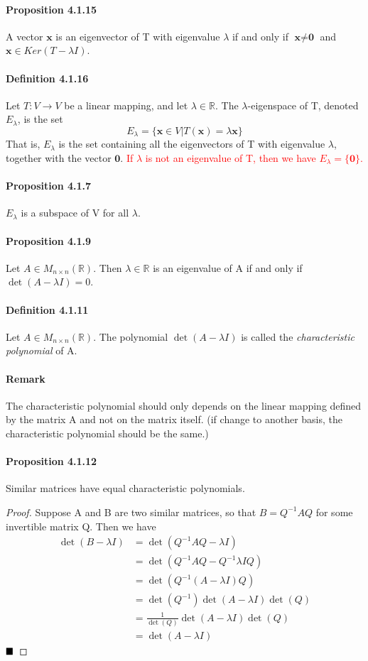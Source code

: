\documentclass[11pt]{article}
\newcommand{\ti}[1]{\textit{#1}}
\newcommand{\tb}[1]{\textbf{#1}}
\newcommand{\qed}[0]{$\hfill\blacksquare$}
\newcommand{\real}[0]{\mathbb{R}}
\newcommand{\vx}[0]{\tb{x}}
\newcommand{\vo}[0]{\tb{0}}
\begin{document}
{\paragraph{Proposition 4.1.15} A vector $\vx$ is an eigenvector of T with eigenvalue $\lambda$ if and only if $\vx \neq \vo$ and $\vx \in Ker(T - \lambda I)$.
\paragraph{Definition 4.1.16} Let $T: V \rightarrow V$ be a linear mapping, and let $\lambda \in \real$. The $\lambda$-eigenspace of T, denoted $E_\lambda$, is the set
$$E_\lambda = \{\vx\in V|T(\vx) = \lambda\vx\}$$
That is, $E_\lambda$ is the set containing all the eigenvectors of T with eigenvalue $\lambda$, together with the vector $\vo$. \textcolor{red}{If $\lambda$ is not an eigenvalue of T, then we have $E_\lambda = \{\vo\}$.}
\paragraph{Proposition 4.1.7} $E_\lambda$ is a subspace of V for all $\lambda$.
\paragraph{Proposition 4.1.9} Let $A \in M_{n\times n}(\real)$. Then $\lambda \in \real$ is an eigenvalue of A if and only if $\det(A - \lambda I) = 0$.
\paragraph{Definition 4.1.11} Let $A \in M_{n\times n}(\real)$. The polynomial $\det(A - \lambda I)$ is called the \ti{characteristic polynomial} of A.
\paragraph{Remark} The characteristic polynomial should only depends on the linear mapping defined by the matrix A and not on the matrix itself. (if change to another basis, the characteristic polynomial should be the same.)
\paragraph{Proposition 4.1.12} Similar matrices have equal characteristic polynomials.
\begin{proof}
	Suppose A and B are two similar matrices, so that $B = Q^{-1}AQ$ for some invertible matrix Q. Then we have
	\begin{align*}
		\det(B-\lambda I) &= \det(Q^{-1}AQ - \lambda I) \\
		&= \det(Q^{-1}AQ - Q^{-1}\lambda IQ) \\
		&= \det(Q^{-1}(A - \lambda I)Q)\\
		&= \det(Q^{-1})\det(A - \lambda I)\det(Q)\\
		&= \frac{1}{\det(Q)}\det(A - \lambda I)\det(Q) \\
		&= \det(A - \lambda I)
	\end{align*}
	\qed
\end{proof}
}
\end{document}
